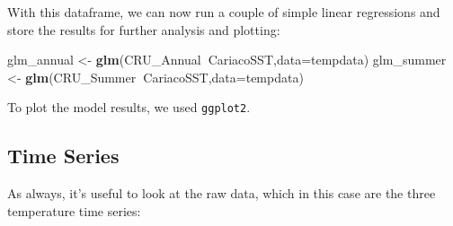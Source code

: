 \documentclass[]{article}
\newenvironment{Shaded}{\begin{snugshade}}{\end{snugshade}}
\newcommand{\KeywordTok}[1]{\textcolor[rgb]{0.13,0.29,0.53}{\textbf{#1}}}
\newcommand{\DataTypeTok}[1]{\textcolor[rgb]{0.13,0.29,0.53}{#1}}
\newcommand{\StringTok}[1]{\textcolor[rgb]{0.31,0.60,0.02}{#1}}
\newcommand{\OperatorTok}[1]{\textcolor[rgb]{0.81,0.36,0.00}{\textbf{#1}}}
\newcommand{\NormalTok}[1]{#1}
\begin{document}
With this dataframe, we can now run a couple of simple linear
regressions and store the results for further analysis and plotting:

\begin{Shaded}
\begin{Highlighting}[]
\NormalTok{glm_annual <-}\StringTok{ }\KeywordTok{glm}\NormalTok{(CRU_Annual}\OperatorTok{~}\NormalTok{CariacoSST,}\DataTypeTok{data=}\NormalTok{tempdata)}
\NormalTok{glm_summer <-}\StringTok{ }\KeywordTok{glm}\NormalTok{(CRU_Summer}\OperatorTok{~}\NormalTok{CariacoSST,}\DataTypeTok{data=}\NormalTok{tempdata)}
\end{Highlighting}
\end{Shaded}

To plot the model results, we used \texttt{ggplot2}.

\begin{Shaded}
\end{Shaded}

\subsection{Time Series}\label{time-series}

As always, it's useful to look at the raw data, which in this case are
the three temperature time series:
\end{document}
